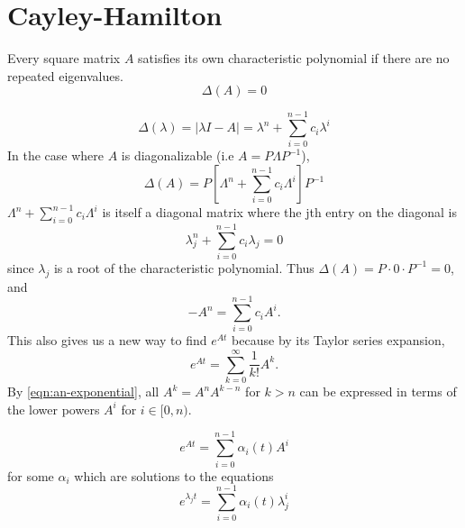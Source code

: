 \section{Cayley-Hamilton}\label{appendix:cayley}
\begin{theorem}
  Every square matrix $A$ satisfies its own characteristic polynomial if there are no repeated eigenvalues.
  \[
	\Delta(A) = 0
  \]
  \label{thm:cayley-hamilton}
\end{theorem}
\[
  \Delta(\lambda) = |\lambda I - A| = \lambda^n + \sum_{i=0}^{n-1} c_i \lambda^i
\]
In the case where $A$ is diagonalizable (i.e $A = P\Lambda P^{-1}$),
\[
  \Delta(A) = P\left[ \Lambda^n + \sum_{i=0}^{n-1}c_i \Lambda^i \right]P^{-1}
\]
$\Lambda^n + \sum_{i=0}^{n-1}c_i \Lambda^i$ is itself a diagonal matrix where the jth entry on the diagonal is
\[
  \lambda_j^n + \sum_{i=0}^{n-1}c_i\lambda_j = 0
\]
since $\lambda_j$ is a root of the characteristic polynomial.
Thus $\Delta(A) = P \cdot 0 \cdot P^{-1} = 0$, and
\begin{equation}
  -A^n = \sum_{i=0}^{n-1}c_iA^i.
  \label{eqn:an-exponential}
\end{equation}
This also gives us a new way to find $e^{At}$ because by its Taylor series expansion,
\[
  e^{At} = \sum_{k=0}^{\infty} \frac{1}{k!}A^k.
\]
By \cref{eqn:an-exponential}, all $A^k = A^{n}A^{k-n}$ for $k>n$ can be expressed in terms of the lower powers $A^i$ for $i\in[0, n)$.
\begin{theorem}
  \[
	e^{At} = \sum_{i=0}^{n-1}\alpha_i(t)A^i
  \] for some $\alpha_i$ which are solutions to the equations
  \[
	e^{\lambda_jt} = \sum_{i=0}^{n-1}\alpha_i(t)\lambda_j^i
  \]
  \label{thm:matrix-exponential}
\end{theorem}


